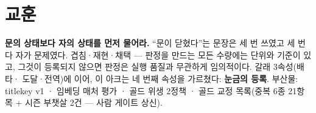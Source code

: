 \documentclass[10pt]{article}
\begin{document}
\section{교훈}

\textbf{문의 상태보다 자의 상태를 먼저 물어라.} ``문이 닫혔다''는
문장은 세 번 쓰였고 세 번 다 자가 문제였다. 겹침·재현·채택 ---
판정을 만드는 모든 수량에는 단위와 기준이 있고, 그것이 등록되지
않으면 판정은 실행 품질과 무관하게 임의적이다. 갈래 3속성(배타·
도달·전역)에 이어, 이 아크는 네 번째 속성을 가르쳤다:
\textbf{눈금의 등록}. 부산물: titlekey v1 · 임베딩 매처 평가 ·
골드 위생 2정책 · 골드 교정 목록(중복 6종 21항목 + 시즌 부챗살
2건 --- 사람 게이트 상신).
\end{document}
